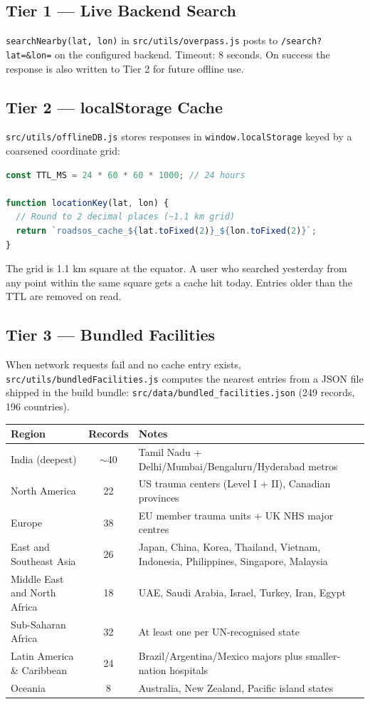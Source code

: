 \documentclass[11pt, a4paper]{article}
\newcommand{\file}[1]{\texttt{\small\color{rsblue}#1}}
\newcommand{\code}[1]{\texttt{\small#1}}
\begin{document}
\subsection{Tier 1 --- Live Backend Search}

\code{searchNearby(lat, lon)} in \file{src/utils/overpass.js} posts to \code{/search?lat=\&lon=} on the configured backend. Timeout: 8 seconds. On success the response is also written to Tier 2 for future offline use.

\subsection{Tier 2 --- localStorage Cache}

\file{src/utils/offlineDB.js} stores responses in \code{window.localStorage} keyed by a coarsened coordinate grid:

\begin{lstlisting}[language=JavaScript,caption={offlineDB.js: 24-hour client-side cache}]
const TTL_MS = 24 * 60 * 60 * 1000; // 24 hours

function locationKey(lat, lon) {
  // Round to 2 decimal places (~1.1 km grid)
  return `roadsos_cache_${lat.toFixed(2)}_${lon.toFixed(2)}`;
}
\end{lstlisting}

The grid is 1.1 km square at the equator. A user who searched yesterday from any point within the same square gets a cache hit today. Entries older than the TTL are removed on read.

\subsection{Tier 3 --- Bundled Facilities}

When network requests fail and no cache entry exists, \file{src/utils/bundledFacilities.js} computes the nearest entries from a JSON file shipped in the build bundle: \file{src/data/bundled\_facilities.json} (249 records, 196 countries).

\begin{tabularx}{\textwidth}{l c X}
\toprule
\textbf{Region} & \textbf{Records} & \textbf{Notes} \\
\midrule
India (deepest) & $\sim$40 & Tamil Nadu + Delhi/Mumbai/Bengaluru/Hyderabad metros \\
North America & 22 & US trauma centers (Level I + II), Canadian provinces \\
Europe & 38 & EU member trauma units + UK NHS major centres \\
East and Southeast Asia & 26 & Japan, China, Korea, Thailand, Vietnam, Indonesia, Philippines, Singapore, Malaysia \\
Middle East and North Africa & 18 & UAE, Saudi Arabia, Israel, Turkey, Iran, Egypt \\
Sub-Saharan Africa & 32 & At least one per UN-recognised state \\
Latin America \& Caribbean & 24 & Brazil/Argentina/Mexico majors plus smaller-nation hospitals \\
Oceania & 8 & Australia, New Zealand, Pacific island states \\
\bottomrule
\end{tabularx}
\end{document}
